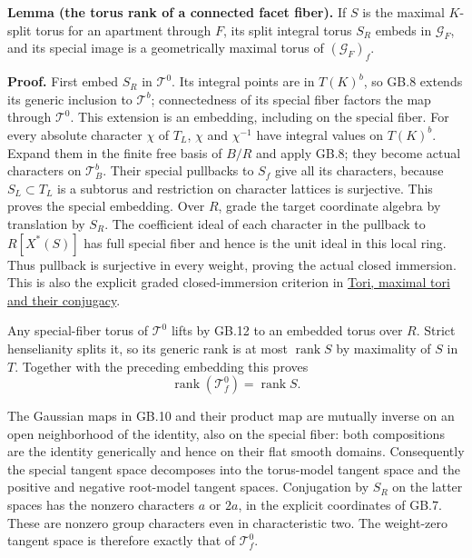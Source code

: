 \documentclass[
  11pt,
]{article}
\begin{document}
\textbf{Lemma (the torus rank of a connected facet fiber).} If \(S\) is
the maximal \(K\)-split torus for an apartment through \(F\), its split
integral torus \(S_R\) embeds in \(\mathcal G_F\), and its special image
is a geometrically maximal torus of \((\mathcal G_F)_f\).

\textbf{Proof.} First embed \(S_R\) in \(\mathcal T^0\). Its integral
points are in \(T(K)^b\), so GB.8 extends its generic inclusion to
\(\mathcal T^b\); connectedness of its special fiber factors the map
through \(\mathcal T^0\). This extension is an embedding, including on
the special fiber. For every absolute character \(\chi\) of \(T_L\),
\(\chi\) and \(\chi^{-1}\) have integral values on \(T(K)^b\). Expand
them in the finite free basis of \(B/R\) and apply GB.8; they become
actual characters on \(\mathcal T^b_B\). Their special pullbacks to
\(S_f\) give all its characters, because \(S_L\subset T_L\) is a
subtorus and restriction on character lattices is surjective. This
proves the special embedding. Over \(R\), grade the target coordinate
algebra by translation by \(S_R\). The coefficient ideal of each
character in the pullback to \(R[X^*(S)]\) has full special fiber and
hence is the unit ideal in this local ring. Thus pullback is surjective
in every weight, proving the actual closed immersion. This is also the
explicit graded closed-immersion criterion in
\href{../AG-RG/AG-RG-01.html}{Tori, maximal tori and their conjugacy}.

Any special-fiber torus of \(\mathcal T^0\) lifts by GB.12 to an
embedded torus over \(R\). Strict henselianity splits it, so its generic
rank is at most \(\operatorname {rank}S\) by maximality of \(S\) in
\(T\). Together with the preceding embedding this proves \[
 \operatorname {rank}(\mathcal T^0_f)=\operatorname {rank}S.
 \tag{GB.43}
\]

The Gaussian maps in GB.10 and their product map are mutually inverse on
an open neighborhood of the identity, also on the special fiber: both
compositions are the identity generically and hence on their flat smooth
domains. Consequently the special tangent space decomposes into the
torus-model tangent space and the positive and negative root-model
tangent spaces. Conjugation by \(S_R\) on the latter spaces has the
nonzero characters \(a\) or \(2a\), in the explicit coordinates of GB.7.
These are nonzero group characters even in characteristic two. The
weight-zero tangent space is therefore exactly that of
\(\mathcal T^0_f\).
\end{document}
